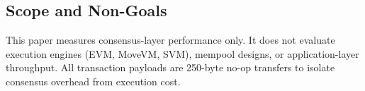 \subsection{Scope and Non-Goals}

This paper measures consensus-layer performance only. It does not evaluate execution
engines (EVM, MoveVM, SVM), mempool designs, or application-layer throughput. All
transaction payloads are 250-byte no-op transfers to isolate consensus overhead from
execution cost.

